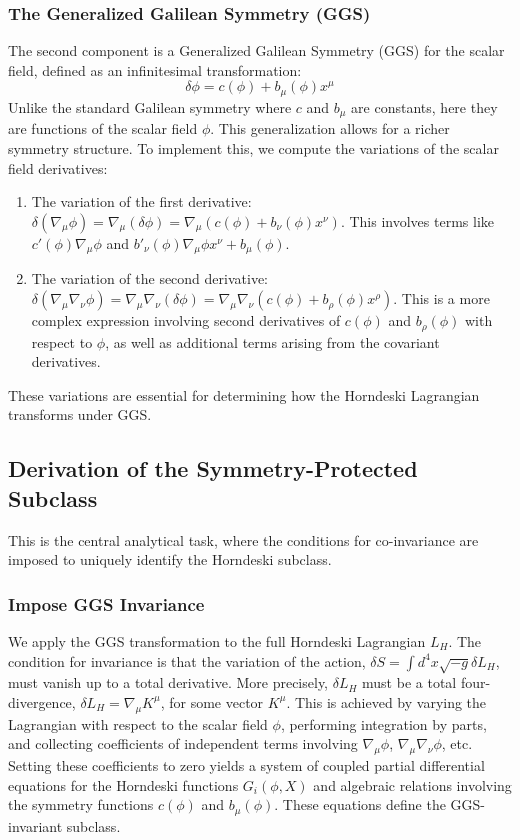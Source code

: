 \documentclass[twocolumn]{aastex631}
\begin{document}
\subsubsection{The Generalized Galilean Symmetry (GGS)}
The second component is a Generalized Galilean Symmetry (GGS) for the scalar field, defined as an infinitesimal transformation:
$$
\delta \phi = c(\phi) + b_\mu(\phi) x^\mu
$$
Unlike the standard Galilean symmetry where $c$ and $b_\mu$ are constants, here they are functions of the scalar field $\phi$. This generalization allows for a richer symmetry structure. To implement this, we compute the variations of the scalar field derivatives:
\begin{enumerate}
    \item The variation of the first derivative: $\delta(\nabla_\mu\phi) = \nabla_\mu(\delta\phi) = \nabla_\mu(c(\phi) + b_\nu(\phi) x^\nu)$. This involves terms like $c'(\phi)\nabla_\mu\phi$ and $b'_\nu(\phi)\nabla_\mu\phi x^\nu + b_\mu(\phi)$.
    \item The variation of the second derivative: $\delta(\nabla_\mu\nabla_\nu\phi) = \nabla_\mu\nabla_\nu(\delta\phi) = \nabla_\mu\nabla_\nu(c(\phi) + b_\rho(\phi) x^\rho)$. This is a more complex expression involving second derivatives of $c(\phi)$ and $b_\rho(\phi)$ with respect to $\phi$, as well as additional terms arising from the covariant derivatives.
\end{enumerate}
These variations are essential for determining how the Horndeski Lagrangian transforms under GGS.

\subsection{Derivation of the Symmetry-Protected Subclass}
This is the central analytical task, where the conditions for co-invariance are imposed to uniquely identify the Horndeski subclass.

\subsubsection{Impose GGS Invariance}
We apply the GGS transformation to the full Horndeski Lagrangian $L_H$. The condition for invariance is that the variation of the action, $\delta S = \int d^4x \sqrt{-g} \delta L_H$, must vanish up to a total derivative. More precisely, $\delta L_H$ must be a total four-divergence, $\delta L_H = \nabla_\mu K^\mu$, for some vector $K^\mu$. This is achieved by varying the Lagrangian with respect to the scalar field $\phi$, performing integration by parts, and collecting coefficients of independent terms involving $\nabla_\mu\phi$, $\nabla_\mu\nabla_\nu\phi$, etc. Setting these coefficients to zero yields a system of coupled partial differential equations for the Horndeski functions $G_i(\phi, X)$ and algebraic relations involving the symmetry functions $c(\phi)$ and $b_\mu(\phi)$. These equations define the GGS-invariant subclass.
\end{document}
